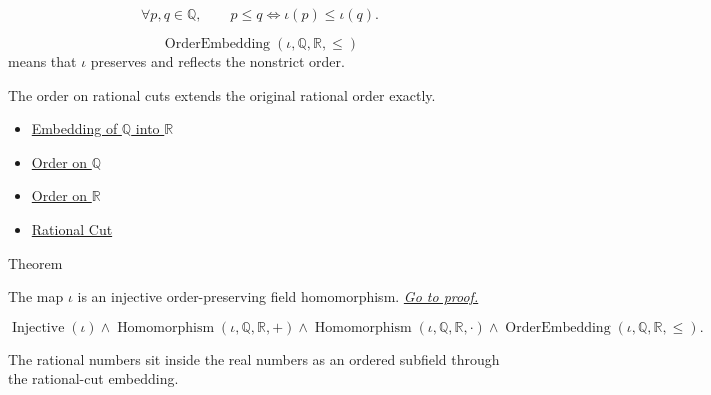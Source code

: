 \begin{remark*}
\[
\forall p,q\in\mathbb{Q},\qquad
p\le q \Longleftrightarrow \iota(p)\le\iota(q).
\]
\end{remark*}

\begin{remark*}
\[
\operatorname{OrderEmbedding}(\iota,\mathbb{Q},\mathbb{R},\le)
\]
means that $\iota$ preserves and reflects the nonstrict order.
\end{remark*}

\begin{remark*}[Interpretation]
The order on rational cuts extends the original rational order exactly.
\end{remark*}

\begin{dependencies}
\begin{itemize}
  \item \hyperref[def:real-chapter-embedding-q-into-r]{Embedding of $\mathbb{Q}$ into $\mathbb{R}$}
  \item \hyperref[def:order-on-q]{Order on $\mathbb{Q}$}
  \item \hyperref[def:order-on-r]{Order on $\mathbb{R}$}
  \item \hyperref[def:rational-cut]{Rational Cut}
\end{itemize}
\end{dependencies}

\begin{theorembox}{Theorem}
\begin{theorem}
\label{thm:q-embeds-into-r}
The map $\iota$ is an injective order-preserving field homomorphism.
\hyperref[prf:q-embeds-into-r]{\textit{Go to proof.}}
\end{theorem}
\end{theorembox}

\begin{remark*}
\[
\operatorname{Injective}(\iota)
\land
\operatorname{Homomorphism}(\iota,\mathbb{Q},\mathbb{R},+)
\land
\operatorname{Homomorphism}(\iota,\mathbb{Q},\mathbb{R},\cdot)
\land
\operatorname{OrderEmbedding}(\iota,\mathbb{Q},\mathbb{R},\le).
\]
\end{remark*}

\begin{remark*}[Interpretation]
The rational numbers sit inside the real numbers as an ordered subfield through the rational-cut embedding.
\end{remark*}

